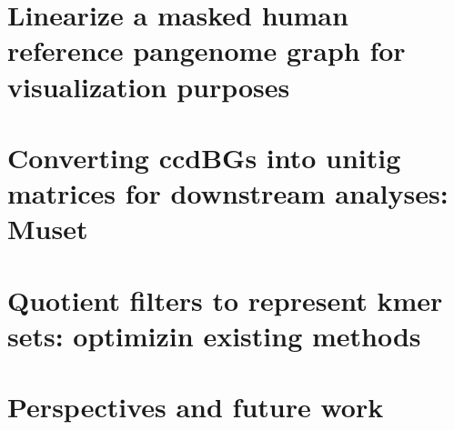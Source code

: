 \section{Linearize a masked human reference pangenome graph for visualization purposes}

\section{Converting ccdBGs into unitig matrices for downstream analyses: Muset}




\section{Quotient filters to represent kmer sets: optimizin existing methods}

\section{Perspectives and future work}

